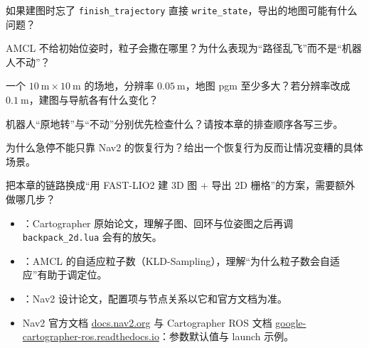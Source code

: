 \begin{problemset}

  \item 如果建图时忘了 \texttt{finish\_trajectory} 直接 \texttt{write\_state}，导出的地图可能有什么问题？
  \item AMCL 不给初始位姿时，粒子会撒在哪里？为什么表现为“路径乱飞”而不是“机器人不动”？
  \item 一个 $10\ \mathrm{m}\times10\ \mathrm{m}$ 的场地，分辨率 $0.05\ \mathrm{m}$，地图 pgm 至少多大？若分辨率改成 $0.1\ \mathrm{m}$，建图与导航各有什么变化？
  \item 机器人“原地转”与“不动”分别优先检查什么？请按本章的排查顺序各写三步。
  \item 为什么急停不能只靠 Nav2 的恢复行为？给出一个恢复行为反而让情况变糟的具体场景。
  \item 把本章的链路换成“用 FAST-LIO2 建 3D 图 + 导出 2D 栅格”的方案，需要额外做哪几步？
\end{problemset}

\begin{reading}

\begin{itemize}
  \item \cite{hess2016cartographer}：Cartographer 原始论文，理解子图、回环与位姿图之后再调 \texttt{backpack\_2d.lua} 会有的放矢。
  \item \cite{fox2003amcl}：AMCL 的自适应粒子数（KLD-Sampling），理解“为什么粒子数会自适应”有助于调定位。
  \item \cite{macenski2020nav2}：Nav2 设计论文，配置项与节点关系以它和官方文档为准。
  \item Nav2 官方文档 \href{https://docs.nav2.org}{docs.nav2.org} 与 Cartographer ROS 文档 \href{https://google-cartographer-ros.readthedocs.io}{google-cartographer-ros.readthedocs.io}：参数默认值与 launch 示例。
\end{itemize}


\end{reading}
